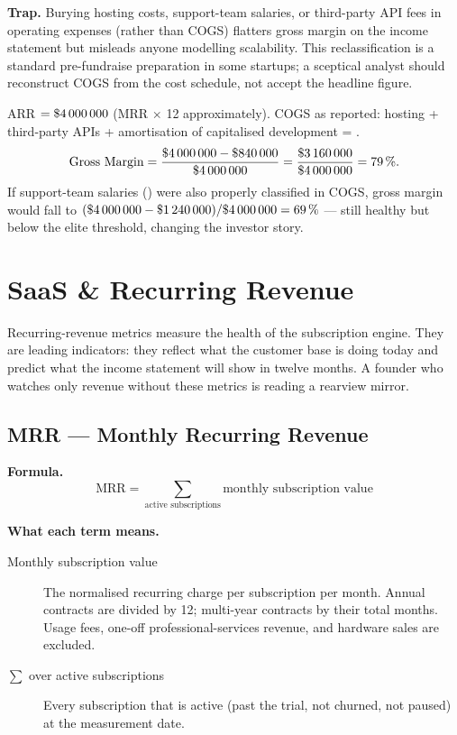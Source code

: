 \textbf{Trap.} Burying hosting costs, support-team salaries, or third-party API fees in
operating expenses (rather than COGS) flatters gross margin on the income statement but
misleads anyone modelling scalability. This reclassification is a standard pre-fundraise
preparation in some startups; a sceptical analyst should reconstruct COGS from the cost
schedule, not accept the headline figure.

\begin{example}
ARR $= \$\num{4000000}$ (MRR  $\times$ 12 approximately). COGS as reported:
hosting  + third-party APIs  + amortisation of capitalised
development  = .
\[
  \text{Gross Margin} = \frac{\$\num{4000000} - \$\num{840000}}{\$\num{4000000}}
    = \frac{\$\num{3160000}}{\$\num{4000000}} = \qty{79}{\percent}.
\]
If support-team salaries () were also properly classified in COGS, gross margin
would fall to $(\$\num{4000000} - \$\num{1240000})/\$\num{4000000} = \qty{69}{\percent}$ ---
still healthy but below the elite threshold, changing the investor story.
\end{example}


\section{SaaS \& Recurring Revenue}

Recurring-revenue metrics measure the health of the subscription engine. They are
leading indicators: they reflect what the customer base is doing today and predict what the
income statement will show in twelve months. A founder who watches only revenue without these
metrics is reading a rearview mirror.

\subsection{MRR --- Monthly Recurring Revenue}

\textbf{Formula.}
\[
  \mathrm{MRR} = \sum_{\text{active subscriptions}} \text{monthly subscription value}
\]

\textbf{What each term means.}
\begin{description}
  \item[Monthly subscription value] The normalised recurring charge per subscription per
    month. Annual contracts are divided by 12; multi-year contracts by their total months.
    Usage fees, one-off professional-services revenue, and hardware sales are excluded.
  \item[$\sum$ over active subscriptions] Every subscription that is active (past the trial,
    not churned, not paused) at the measurement date.
\end{description}

